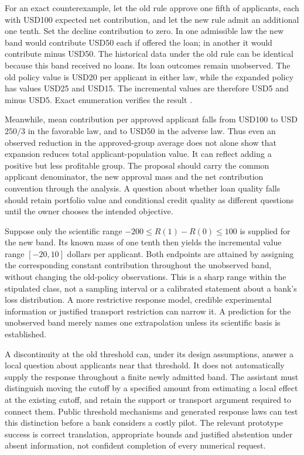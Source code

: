 For an exact counterexample, let the old rule approve one fifth of applicants,
each with USD100 expected net contribution, and let the new rule admit an
additional one tenth. Set the decline contribution to zero. In one admissible
law the new band would contribute USD50 each if offered the loan; in another
it would contribute minus USD50. The historical data under the old rule can
be identical because this band received no loans. Its loan outcomes remain
unobserved. The old policy value is USD20 per applicant in either law, while
the expanded policy has values USD25 and USD15. The incremental values
are therefore USD5 and minus USD5. Exact enumeration verifies the result
\citep{exec17_l2_policy_exact}.

Meanwhile, mean contribution per approved applicant falls from USD100 to
USD$250/3$ in the favorable law, and to USD50 in the adverse law. Thus even
an observed reduction in the approved-group average does not alone show that
expansion reduces total applicant-population value. It can reflect adding a
positive but less profitable group. The proposal should carry the common
applicant denominator, the new approval mass and the net contribution
convention through the analysis. A question about whether loan quality falls
should retain portfolio value and conditional credit quality as
different questions until the owner chooses the intended objective.

Suppose only the scientific range
$-200\leq R(1)-R(0)\leq100$ is supplied for the new band. Its known mass
of one tenth then yields the incremental value range $[-20,10]$ dollars
per applicant. Both endpoints are attained by assigning the corresponding
constant contribution throughout the unobserved band, without changing the
old-policy observations. This is a sharp range within the stipulated class,
not a sampling interval or a calibrated statement about a bank's loss
distribution. A more restrictive response model, credible experimental
information or justified transport restriction can narrow it. A prediction
for the unobserved band merely names one extrapolation unless its scientific
basis is established.

A discontinuity at the old threshold can, under its design assumptions,
answer a local question about applicants near that threshold. It does not
automatically supply the response throughout a finite newly admitted band.
The assistant must distinguish moving the cutoff by a specified amount
from estimating a local effect at the existing cutoff, and retain the
support or transport argument required to connect them. Public threshold
mechanisms and generated response laws can test this distinction before a
bank considers a costly pilot. The relevant prototype success is correct
translation, appropriate bounds and justified abstention under absent
information, not confident completion of every numerical request.
\label{exec17:l2-policy-end}
